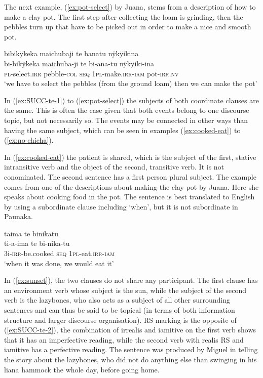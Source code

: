 The next example, (\ref{ex:pot-select}) by Juana, stems from a description of how to make a clay pot. The first step after collecting the loam is grinding, then the pebbles turn up that have to be picked out in order to make a nice and smooth pot.

\ea\label{ex:pot-select}
\begingl
\glpreamble bibikÿkeka maichubaji te banatu nÿkÿikina\\
\gla bi-bikÿkeka maichuba-ji te bi-ana-tu nÿkÿiki-ina\\
\textsc{pl}-select.\textsc{irr} pebble-\textsc{col} \textsc{seq} 1\textsc{pl}-make.\textsc{irr}-\textsc{iam} pot-\textsc{irr.nv}\\
\glft ‘we have to select the pebbles (from the ground loam) then we can make the pot’
\endgl
\trailingcitation{[jmx-d110918ls-1.005]}
\xe


In (\ref{ex:SUCC-te-1}) to (\ref{ex:pot-select}) the subjects of both coordinate clauses are the same. This is often the case given that both events belong to one discourse topic, but not necessarily so. The events may be connected in other ways than having the same subject, which can be seen in examples (\ref{ex:cooked-eat}) to (\ref{ex:no-chicha}).

In (\ref{ex:cooked-eat}) the patient is shared, which is the subject of the first, stative intransitive verb and the object of the second, transitive verb. It is not conominated. The second sentence has a first person plural subject. %
 The example comes from one of the descriptions about making the clay pot by Juana. Here she speaks about cooking food in the pot. The sentence is best translated to English by using a subordinate clause including ‘when’, but it is not subordinate in Paunaka.

\ea\label{ex:cooked-eat}
\begingl
\glpreamble taima te binikatu\\
\gla ti-a-ima te bi-nika-tu\\
\glb 3i-\textsc{irr}-be.cooked \textsc{seq} 1\textsc{pl}-eat.\textsc{irr}-\textsc{iam}\\
\glft ‘when it was done, we would eat it’
\endgl
\trailingcitation{[jxx-d110923l-2.25]}
\xe


In (\ref{ex:sunset}), the two clauses do not share any participant. The first clause has an environment verb whose subject is the sun, while the subject of the second verb is the lazybones, who also acts as a subject of all other surrounding sentences and can thus be said to be topical (in terms of both information structure and larger discourse organisation). RS marking is the opposite of (\ref{ex:SUCC-te-2}), the combination of irrealis and iamitive on the first verb shows that it has an imperfective reading, while the second verb with realis RS and iamitive has a perfective reading. The sentence was produced by Miguel in telling the story about the lazybones, who did not do anything else than swinging in his liana hammock the whole day, before going home.

